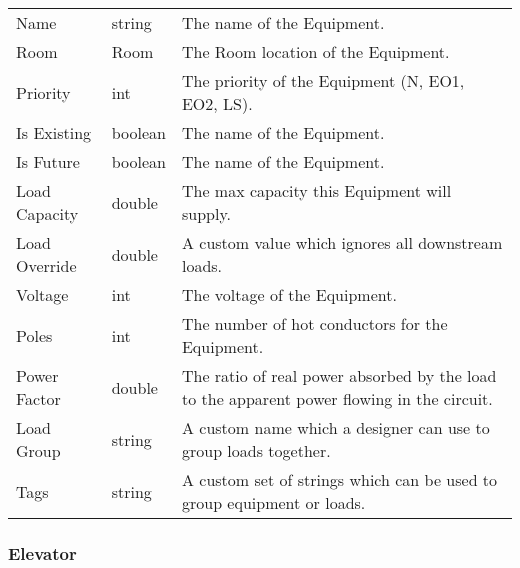 \documentclass[letterpaper,10pt,english]{sphinxmanual}
\begin{document}
\begin{savenotes}\sphinxattablestart
\centering
\begin{tabulary}{\linewidth}[t]{|T|T|T|}
\hline
\sphinxstyletheadfamily 
{}
&\sphinxstyletheadfamily 
{}
&\sphinxstyletheadfamily 
{}
\\
\hline
Name
&
string
&
The name of the Equipment.
\\
\hline
Room
&
Room
&
The Room location of the Equipment.
\\
\hline
Priority
&
int
&
The priority of the Equipment (N, EO1, EO2, LS).
\\
\hline
Is Existing
&
boolean
&
The name of the Equipment.
\\
\hline
Is Future
&
boolean
&
The name of the Equipment.
\\
\hline
Load Capacity
&
double
&
The max capacity this Equipment will supply.
\\
\hline
Load Override
&
double
&
A custom value which ignores all downstream loads.
\\
\hline
Voltage
&
int
&
The voltage of the Equipment.
\\
\hline
Poles
&
int
&
The number of hot conductors for the Equipment.
\\
\hline
Power Factor
&
double
&
The ratio of real power absorbed by the load to the apparent power flowing in the circuit.
\\
\hline
Load Group
&
string
&
A custom name which a designer can use to group loads together.
\\
\hline
Tags
&
string
&
A custom set of strings which can be used to group equipment or loads.
\\
\hline
\end{tabulary}
\par
\sphinxattableend\end{savenotes}


\subsubsection{Elevator}
\label{\detokenize{docs/definitions/index-definitions:elevator}}\label{\detokenize{docs/definitions/index-definitions:elevator-definition}}
\end{document}
